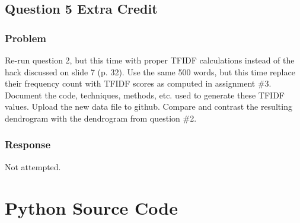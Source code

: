 \documentclass[letterpaper,11pt]{report}
\begin{document}
\begin{savenotes}
\section{Question 5 Extra Credit}
\subsection{Problem}Re-run question 2, but this time with proper TFIDF calculations instead of the hack discussed on slide 7 (p. 32).  Use the same 500 words, but this time replace their frequency count with TFIDF scores as computed in assignment \#3.  Document the code, techniques, methods, etc. used to generate these TFIDF values.  Upload the new data file to github. Compare and contrast the resulting dendrogram with the dendrogram from question \#2.
\subsection{Response}Not attempted.

\end{savenotes}




\appendix
{}

\chapter{Python Source Code} \label{chap:python}


\end{document}

